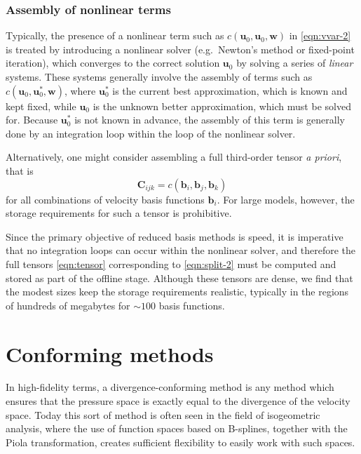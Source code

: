 \documentclass[onecolumn, twoside, a4paper, 11pt]{article}
\begin{document}
\subsubsection{Assembly of nonlinear terms}

Typically, the presence of a nonlinear term such as $c(\bm u_0, \bm u_0, \bm w)$
in \eqref{eqn:vvar-2} is treated by introducing a nonlinear solver
(e.g.~Newton's method or fixed-point iteration), which converges to the correct
solution $\bm u_0$ by solving a series of \emph{linear} systems. These systems
generally involve the assembly of terms such as $c(\bm u_0, \bm u_0^*, \bm w)$,
where $\bm u_0^*$ is the current best approximation, which is known and kept
fixed, while $\bm u_0$ is the unknown better approximation, which must be solved
for. Because $\bm u_0^*$ is not known in advance, the assembly of this term is
generally done by an integration loop within the loop of the nonlinear solver.

Alternatively, one might consider assembling a full third-order tensor
\emph{a priori}, that is
\begin{equation}
  \bm C_{ijk} = c(\bm b_i, \bm b_j, \bm b_k)
  \label{eqn:tensor}
\end{equation}
for all combinations of velocity basis functions $\bm b_i$. For large models,
however, the storage requirements for such a tensor is prohibitive.

Since the primary objective of reduced basis methods is speed, it is imperative
that no integration loops can occur within the nonlinear solver, and therefore
the full tensors \eqref{eqn:tensor} corresponding to \eqref{eqn:split-2} must be
computed and stored as part of the offline stage. Although these tensors are
dense, we find that the modest sizes keep the storage requirements realistic,
typically in the regions of hundreds of megabytes for $\sim 100$ basis
functions.

\section{Conforming methods}
\label{sec:conforming}

In high-fidelity terms, a divergence-conforming method is any method which
ensures that the pressure space is exactly equal to the divergence of the
velocity space. Today this sort of method is often seen in the field of
isogeometric analysis, where the use of function spaces based on B-splines,
together with the Piola transformation, creates sufficient flexibility to easily
work with such spaces.
\end{document}
